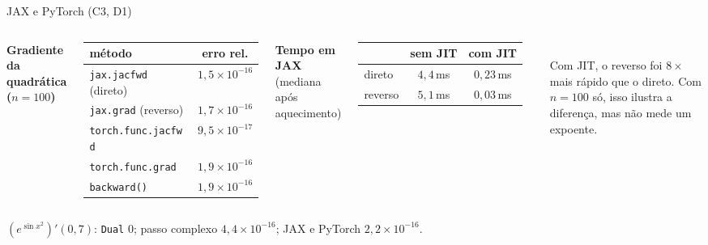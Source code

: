 \documentclass[aspectratio=169,11pt]{beamer}
\begin{document}


\begin{frame}{JAX e PyTorch (C3, D1)}
  \small
  \begin{columns}[T]
    \textbf{Gradiente da quadrática ($n=100$)}\\[0.3em]
    \begin{tabular}{lc}
      \toprule
      método & erro rel. \\
      \midrule
      \texttt{jax.jacfwd} (direto) & $1{,}5\times10^{-16}$ \\
      \texttt{jax.grad} (reverso) & $1{,}7\times10^{-16}$ \\
      \texttt{torch.func.jacfwd} & $9{,}5\times10^{-17}$ \\
      \texttt{torch.func.grad} & $1{,}9\times10^{-16}$ \\
      \texttt{backward()} & $1{,}9\times10^{-16}$ \\
      \bottomrule
    \end{tabular}
    \textbf{Tempo em JAX} (mediana após aquecimento)\\[0.3em]
    \begin{tabular}{lcc}
      \toprule
      & sem JIT & com JIT \\
      \midrule
      direto & $4{,}4$\,ms & $0{,}23$\,ms \\
      reverso & $5{,}1$\,ms & $0{,}03$\,ms \\
      \bottomrule
    \end{tabular}\\[0.4em]
    Com JIT, o reverso foi $8\times$ mais rápido que o direto. Com $n=100$ só, isso ilustra a diferença, mas não mede um expoente.
  \end{columns}
  \vspace{0.6em}
  $(e^{\sin x^2})'(0{,}7)$: \texttt{Dual} $0$; passo complexo $4{,}4\times10^{-16}$; JAX e PyTorch $2{,}2\times10^{-16}$.
\end{frame}
\end{document}

